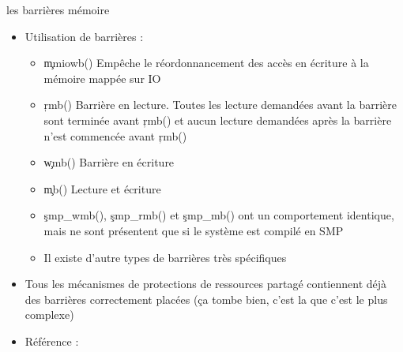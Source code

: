 \begin{frame}[fragile=singleslide]{les barrières mémoire}
  \begin{itemize} 
  \item Utilisation de barrières :
    \begin{itemize}
    \item  \c{mmiowb()}  Empêche  le  réordonnancement  des  accès  en
      écriture à la mémoire mappée sur IO
    \item \c{rmb()} Barrière en  lecture. Toutes les lecture demandées
      avant la barrière sont terminée avant \c{rmb()} et aucun lecture
      demandées après la barrière n'est commencée avant \c{rmb()}
    \item \c{wmb()} Barrière en écriture
    \item \c{mb()} Lecture et écriture
    \item   \c{smp_wmb()},  \c{smp_rmb()}   et  \c{smp_mb()}   ont  un
      comportement  identique,  mais  ne  sont présentent  que  si  le
      système est compilé en SMP
    \item Il existe d'autre types de barrières très spécifiques
    \end{itemize} 
  \item  Tous  les  mécanismes  de protections  de  ressources  partagé
    contiennent  déjà  des barrières  correctement  placées (ça  tombe
    bien, c'est la que c'est le plus complexe)
  \item Référence : 
  \end{itemize} 
\end{frame} 

